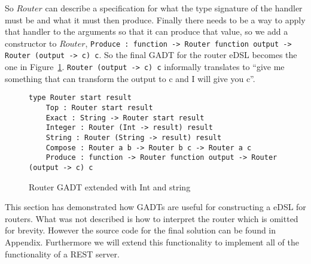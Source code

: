 So $Router$ can describe a specification for what the type signature of the
handler must be and what it must then produce. Finally there needs to be a way
to apply that handler to the arguments so that it can produce that value, so we
add a constructor to $Router$, \texttt{Produce : function -> Router function
output -> Router (output -> c) c}. So the final GADT for the router eDSL becomes
the one in Figure~\ref{finalrouter}. \texttt{Router (output -> c) c} informally
translates to ``give me something that can transform the output to c and I will
give you c''.

\begin{figure}[H]
    \begin{lstlisting}
type Router start result 
    Top : Router start result
    Exact : String -> Router start result
    Integer : Router (Int -> result) result
    String : Router (String -> result) result
    Compose : Router a b -> Router b c -> Router a c
    Produce : function -> Router function output -> Router (output -> c) c
    \end{lstlisting}
    \caption{Router GADT extended with Int and string}
    \label{finalrouter}
\end{figure}

This section has demonstrated how GADTs are useful for constructing a eDSL for
routers. What was not described is how to interpret the router which is omitted
for brevity. However the source code for the final solution can be found in
Appendix. Furthermore we will extend this functionality to implement all of the
functionality of a REST server.




